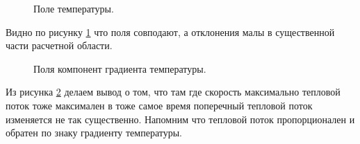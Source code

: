 \begin{figure}[H]
    \centering
    \caption{Поле температуры.}
    \label{fig:05}
\end{figure}
Видно по рисунку \ref{fig:05} что поля совподают, а отклонения малы в существенной части расчетной области.
\begin{figure}[H]
    \centering
    \caption{Поля компонент градиента температуры.}
    \label{fig:06}
\end{figure}
Из рисунка \ref{fig:06} делаем вывод о том, что там где скорость максимально тепловой поток тоже максимален в тоже самое время поперечный тепловой поток изменяется не так существенно. Напомним что тепловой поток пропорционален и обратен по знаку градиенту температуры.

